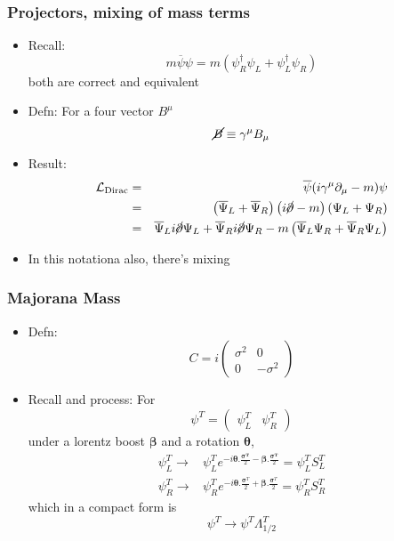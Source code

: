 \documentclass{beamer}
\begin{document}
\begin{frame}
	\frametitle{Projectors, mixing of mass terms}
	\begin{itemize}
		\item Recall: 
\[
m\overline{\psi}\psi=m(\psi_{R}^{\dagger}\psi_{L}+\psi_{L}^{\dagger}\psi_{R})
\]
\pause 
both are correct and equivalent
\pause 
		\item Defn: For a four vector $B^{\mu}$ 
		\pause
\[
\cancel{B}\equiv\gamma^{\mu}B_{\mu}
\]
\pause
		\item Result:
		\pause
\[
\begin{aligned}\mathcal{L}_{\text{Dirac}} & = & \overline{\psi}(i\gamma^{\mu}\partial_{\mu}-m)\psi\\
 & = & \left(\overline{\Psi}_{L}+\overline{\Psi}_{R}\right)\left(i\cancel{\partial}-m\right)\left(\Psi_{L}+\Psi_{R}\right)\\
 & = & \overline{\Psi}_{L}i\cancel{\partial}\Psi_{L}+\overline{\Psi}_{R}i\cancel{\partial}\Psi_{R}-m\left(\overline{\Psi}_{L}\Psi_{R}+\overline{\Psi}_{R}\Psi_{L}\right)
\end{aligned}
\]
\pause
		\item In this notationa also, there's mixing




	\end{itemize}
\end{frame}

 










\begin{frame}
	\frametitle{Majorana Mass}
	\begin{itemize}
		\item Defn:
\[
C=i\left(\begin{array}{cc}
\sigma^{2} & 0\\
0 & -\sigma^{2}
\end{array}\right)
\]
\pause
		\item Recall and process: For	
\[
\psi^{T}=\left(\begin{array}{cc}
\psi_{L}^{T} & \psi_{R}^{T}\end{array}\right)
\]
\pause
under a lorentz boost $\mathbf{\beta}$ and a rotation $\mathbf{\theta}$,
\pause
\[
\begin{aligned}\psi_{L}^{T}\rightarrow & \psi_{L}^{T}e^{-i\mathbf{\theta}.\frac{\mathbf{\sigma^{T}}}{2}-\mathbf{\beta}.\frac{\mathbf{\sigma^{T}}}{2}}=\psi_{L}^{T}S_{L}^{T}\\
\psi_{R}^{T}\rightarrow & \psi_{R}^{T}e^{-i\mathbf{\theta}.\frac{\mathbf{\sigma}^{T}}{2}+\mathbf{\beta}.\frac{\mathbf{\sigma}^{T}}{2}}=\psi_{R}^{T}S_{R}^{T}
\end{aligned}
\]
\pause
which in a compact form is
\[
\psi^{T}\rightarrow\psi^{T}\Lambda_{1/2}^{T}
\]

	\end{itemize}
\end{frame}
\end{document}
